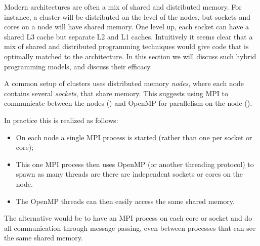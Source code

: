 
Modern architectures are often a mix of shared and distributed
memory. For instance, a cluster will be distributed on the level of
the nodes, but sockets and cores on a node will have shared
memory. One level up, each socket can have a shared L3 cache but
separate L2 and L1 caches. Intuitively it seems clear that a mix of
shared and distributed programming techniques would give code
that is optimally matched to the architecture. In this section we will
discuss such hybrid programming models, and discuss their efficacy.

A common setup of clusters uses distributed memory
\emph{nodes}, where each node contains several
\emph{sockets}, that share memory. This suggests
using MPI to communicate between the nodes
() and OpenMP for parallelism on
the node ().

In practice this is realized as follows:
\begin{itemize}
\item On each node a single MPI process is started (rather than one
  per socket or core);
\item This one MPI process then uses OpenMP (or another threading
  protocol) to spawn as many threads are there are independent sockets
  or cores on the node.
\item The OpenMP threads can then easily access the same shared memory.
\end{itemize}
The alternative would be to have an MPI process on each core or
socket and do all communication through message passing, even between
processes that can see the same shared memory.

